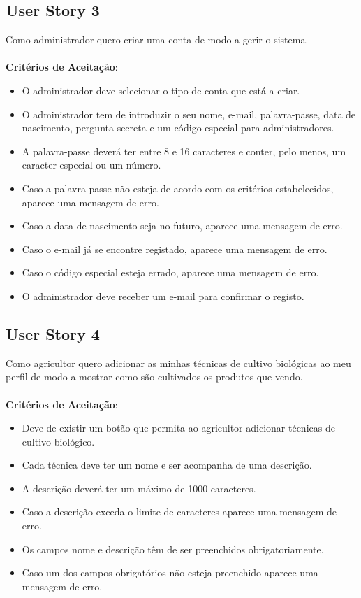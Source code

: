 \documentclass[a4paper,11pt]{article}
\begin{document}
\subsection{User Story 3}
Como administrador quero criar uma conta de modo a gerir o sistema.\\\\
\textbf{Critérios de Aceitação}:
\begin{itemize}
  \item O administrador deve selecionar o tipo de conta que está a criar.
  \item O administrador tem de introduzir o seu nome, e-mail, palavra-passe, data de nascimento, pergunta secreta e um código especial para administradores.
  \item A palavra-passe deverá ter entre 8 e 16 caracteres e conter, pelo menos, um caracter especial ou um número.
  \item Caso a palavra-passe não esteja de acordo com os critérios estabelecidos, aparece uma mensagem de erro.
  \item Caso a data de nascimento seja no futuro, aparece uma mensagem de erro.
  \item Caso o e-mail já se encontre registado, aparece uma mensagem de erro.
  \item Caso o código especial esteja errado, aparece uma mensagem de erro.
  \item O administrador deve receber um e-mail para confirmar o registo.
\end{itemize}
\subsection{User Story 4}
Como agricultor quero adicionar as minhas técnicas de cultivo biológicas ao meu perfil de modo a mostrar como são cultivados os produtos que vendo.\\\\
\textbf{Critérios de Aceitação}:
\begin{itemize}
  \item Deve de existir um botão que permita ao agricultor adicionar técnicas de cultivo biológico.
  \item Cada técnica deve ter um nome e ser acompanha de uma descrição.
  \item A descrição deverá ter um máximo de 1000 caracteres.
  \item Caso a descrição exceda o limite de caracteres aparece uma mensagem de erro.
  \item Os campos nome e descrição têm de ser preenchidos obrigatoriamente.
  \item Caso um dos campos obrigatórios não esteja preenchido aparece uma mensagem de erro.
\end{itemize}
\end{document}
